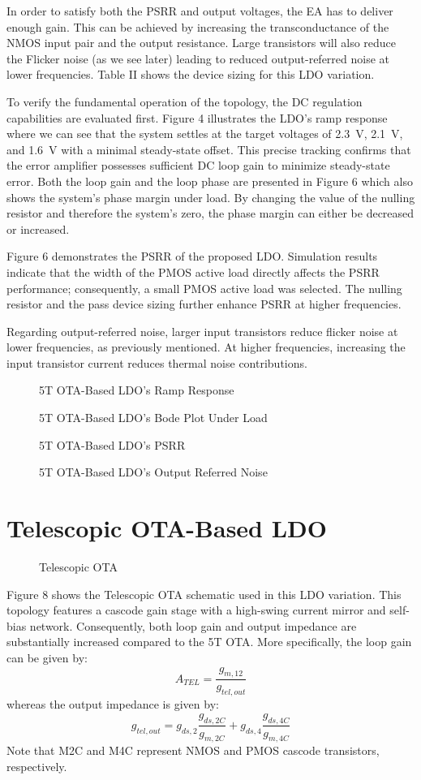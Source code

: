 \documentclass[journal]{IEEEtran}
\newcommand{\svg}[3]{
    \begin{figure}[!h]
        \centering
        
        \caption{#2}
    \end{figure}
}
\begin{document}
In order to satisfy both the PSRR and output voltages, the EA has to deliver enough gain. This can be achieved by increasing the transconductance of the NMOS input pair and the output resistance. Large transistors will also reduce the Flicker noise (as we see later) leading to reduced output-referred noise at lower frequencies. Table II shows the device sizing for this LDO variation.

To verify the fundamental operation of the topology, the DC regulation capabilities are evaluated first. Figure 4 illustrates the LDO's ramp response where we can see that the system settles at the target voltages of \qty{2.3}{\volt}, \qty{2.1}{\volt}, and \qty{1.6}{\volt} with a minimal steady-state offset. This precise tracking confirms that the error amplifier possesses sufficient DC loop gain to minimize steady-state error. Both the loop gain and the loop phase are presented in Figure 6 which also shows the system's phase margin under load. By changing the value of the nulling resistor and therefore the system's zero, the phase margin can either be decreased or increased.

Figure 6 demonstrates the PSRR of the proposed LDO. Simulation results indicate that the width of the PMOS active load directly affects the PSRR performance; consequently, a small PMOS active load was selected. The nulling resistor and the pass device sizing further enhance PSRR at higher frequencies.

Regarding output-referred noise, larger input transistors reduce flicker noise at lower frequencies, as previously mentioned. At higher frequencies, increasing the input transistor current reduces thermal noise contributions.

\svg{../simulations/images/5t_tran.svg}{5T OTA-Based LDO's Ramp Response}{1}

\svg{../simulations/images/5t_bode.svg}{5T OTA-Based LDO's Bode Plot Under Load}{1}

\svg{../simulations/images/5t_psrr.svg}{5T OTA-Based LDO's PSRR}{1}

\svg{../simulations/images/5t_noise.svg}{5T OTA-Based LDO's Output Referred Noise}{1}

\section{Telescopic OTA-Based LDO}
\svg{../images/tel_ota.svg}{Telescopic OTA}{1}
Figure 8 shows the Telescopic OTA schematic used in this LDO variation. This topology features a cascode gain stage with a high-swing current mirror and self-bias network. Consequently, both loop gain and output impedance are substantially increased compared to the 5T OTA. More specifically, the loop gain can be given by:
\begin{equation}
    A_{TEL} = \frac{g_{m,12}}{g_{tel,out}}
\end{equation}
whereas the output impedance is given by:
\begin{equation}
    g_{tel,out} =
        g_{ds,2} \frac{g_{ds,2C}}{g_{m,2C}} +
        g_{ds,4} \frac{g_{ds,4C}}{g_{m,4C}}
\end{equation}
Note that M2C and M4C represent NMOS and PMOS cascode transistors, respectively.
\end{document}
